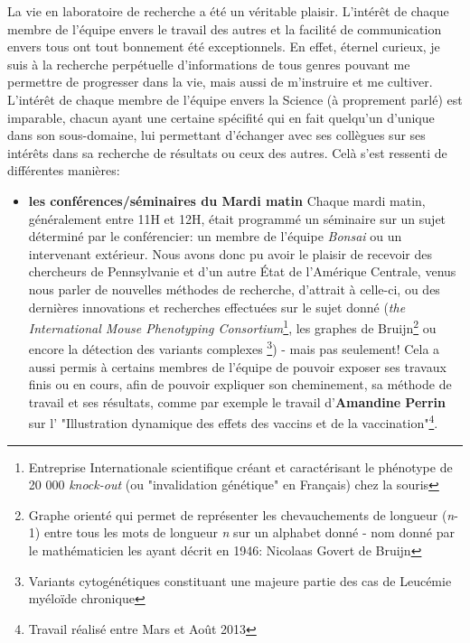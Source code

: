 \documentclass[12pt]{report}
\begin{document}
\begin{spacing}{1.2}
La vie en laboratoire de recherche a été un véritable plaisir.
\newline
L'intérêt de chaque membre de l'équipe envers le travail des autres et la facilité de communication envers tous ont tout bonnement été exceptionnels. En effet, éternel curieux, je suis à la recherche perpétuelle d'informations de tous genres pouvant me permettre de progresser dans la vie, mais aussi de m'instruire et me cultiver. L'intérêt de chaque membre de l'équipe envers la Science (à proprement parlé) est imparable, chacun ayant une certaine spécifité qui en fait quelqu'un d'unique dans son sous-domaine, lui permettant d'échanger avec ses collègues sur ses intérêts dans sa recherche de résultats ou ceux des autres.
\newline
Celà s'est ressenti de différentes manières:
\begin{itemize}
\item \textbf{les conférences/séminaires du Mardi matin}
	\newline
	Chaque mardi matin, généralement entre 11H et 12H, était programmé un séminaire sur un sujet déterminé par le conférencier: un membre de l'équipe \textit{Bonsai} ou un intervenant extérieur.
	\newline
	Nous avons donc pu avoir le plaisir de recevoir des chercheurs de Pennsylvanie et d'un autre État de l'Amérique Centrale, venus nous parler de nouvelles méthodes de recherche, d'attrait à celle-ci, ou des dernières innovations et recherches effectuées sur le sujet donné (\textit{the International Mouse Phenotyping Consortium}\footnote{Entreprise Internationale scientifique créant et caractérisant le phénotype de 20 000 \textit{knock-out} (ou "invalidation génétique" en Français) chez la souris}, les graphes de Bruijn\footnote{Graphe orienté qui permet de représenter les chevauchements de longueur (\textit{n}-1) entre tous les mots de longueur \textit{n} sur un alphabet donné - nom donné par le mathématicien les ayant décrit en 1946: Nicolaas Govert de Bruijn} ou encore la détection des variants complexes \footnote{Variants cytogénétiques constituant une majeure partie des cas de Leucémie myéloïde chronique}) -  mais pas seulement!
	\newline
	Cela a aussi permis à certains membres de l'équipe de pouvoir exposer ses travaux finis ou en cours, afin de pouvoir expliquer son cheminement, sa méthode de travail et ses résultats, comme par exemple le travail d'\textbf{Amandine Perrin} sur l' "Illustration dynamique des effets des vaccins et de la vaccination"\footnote{Travail réalisé entre Mars et Août 2013}.

\end{itemize}
\end{spacing}
\end{document}

